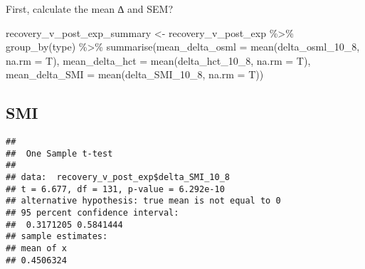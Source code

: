 \documentclass[
]{article}
\newenvironment{Shaded}{\begin{snugshade}}{\end{snugshade}}
\newcommand{\AttributeTok}[1]{\textcolor[rgb]{0.77,0.63,0.00}{#1}}
\newcommand{\DecValTok}[1]{\textcolor[rgb]{0.00,0.00,0.81}{#1}}
\newcommand{\FunctionTok}[1]{\textcolor[rgb]{0.00,0.00,0.00}{#1}}
\newcommand{\NormalTok}[1]{#1}
\newcommand{\OtherTok}[1]{\textcolor[rgb]{0.56,0.35,0.01}{#1}}
\newcommand{\SpecialCharTok}[1]{\textcolor[rgb]{0.00,0.00,0.00}{#1}}
\newcommand{\StringTok}[1]{\textcolor[rgb]{0.31,0.60,0.02}{#1}}
\begin{document}
First, calculate the mean ∆ and SEM?

\begin{Shaded}
\begin{Highlighting}[]
\NormalTok{recovery\_v\_post\_exp\_summary }\OtherTok{\textless{}{-}}\NormalTok{ recovery\_v\_post\_exp }\SpecialCharTok{\%\textgreater{}\%}
  \FunctionTok{group\_by}\NormalTok{(type) }\SpecialCharTok{\%\textgreater{}\%}
  \FunctionTok{summarise}\NormalTok{(}\AttributeTok{mean\_delta\_osml =} \FunctionTok{mean}\NormalTok{(delta\_osml\_10\_8, }\AttributeTok{na.rm =}\NormalTok{ T),}
            \AttributeTok{mean\_delta\_hct =} \FunctionTok{mean}\NormalTok{(delta\_hct\_10\_8, }\AttributeTok{na.rm =}\NormalTok{ T),}
            \AttributeTok{mean\_delta\_SMI =} \FunctionTok{mean}\NormalTok{(delta\_SMI\_10\_8, }\AttributeTok{na.rm =}\NormalTok{ T))}
\end{Highlighting}
\end{Shaded}

\hypertarget{smi}{%
\subsection{SMI}\label{smi}}

\begin{Shaded}
\end{Shaded}

\begin{verbatim}
## 
##  One Sample t-test
## 
## data:  recovery_v_post_exp$delta_SMI_10_8
## t = 6.677, df = 131, p-value = 6.292e-10
## alternative hypothesis: true mean is not equal to 0
## 95 percent confidence interval:
##  0.3171205 0.5841444
## sample estimates:
## mean of x 
## 0.4506324
\end{verbatim}

\begin{Shaded}
\end{Shaded}
\end{document}
